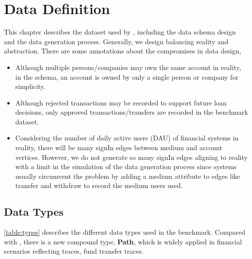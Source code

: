 \chapter{Data Definition}
\label{sec:data-definition}

This chapter describes the dataset used by \ldbcfinbench, including the data
schema design and the data generation process. Generally, we design
\ldbcfinbench balancing reality and abstraction. There are some annotations
about the compromises in data design,
\begin{itemize}
    \item Although multiple persons/companies may own the same account in
          reality, in the schema, an account is owned by only a single person
          or company for simplicity.
    \item Although rejected transactions may be recorded to support future loan
          decisions, only approved transactions/transfers are recorded in the
          benchmark dataset.
    \item Considering the number of daily active users (DAU) of financial systems
          in reality, there will be many signIn edges between medium and account
          vertices. However, we do not generate so many signIn edges aligning to
          reality with a limit in the simulation of the data generation process
          since systems usually circumvent the problem by adding a medium attribute
          to edges like transfer and withdraw to record the medium users used.
\end{itemize}

\section{Data Types}

\autoref{table:types} describes the different data types used in the benchmark.
Compared with \ldbcsnb, there is a new compound type, \textbf{Path}, which is
widely applied in financial scenarios reflecting traces, \eg fund transfer
traces.

